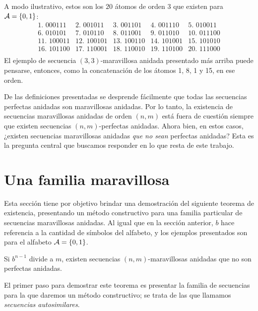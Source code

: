 A modo ilustrativo, estos son los $20$ átomos de orden $3$ que existen para
$\mathcal{A} = \lbrace 0, 1 \rbrace$:
\[
	\begin{array}{ccccc}
		\text{1. }000111 & \text{2. }001011 & \text{3. }001101 & \text{4. }001110 & \text{5. }010011 \\
		\text{6. }010101 & \text{7. }010110 & \text{8. }011001 & \text{9. }011010 & \text{10. }011100 \\
		\text{11. }100011 & \text{12. }100101 & \text{13. }100110 & \text{14. }101001 & \text{15. }101010 \\
		\text{16. }101100 & \text{17. }110001 & \text{18. }110010 & \text{19. }110100 & \text{20. }111000 \\
	\end{array}
\]
El ejemplo de secuencia $(3,3)$-maravillosa anidada presentado más arriba puede
pensarse, entonces, como la concatenación de los átomos 1, 8, 1 y 15, en ese
orden.

De las definiciones presentadas se desprende fácilmente que todas las secuencias
perfectas anidadas son maravillosas anidadas. Por lo tanto, la existencia de
secuencias maravillosas anidadas de orden $(n,m)$ está fuera de cuestión
siempre que existen secuencias $(n,m)$-perfectas anidadas. Ahora bien, en estos
casos, ¿existen secuencias maravillosas anidadas \emph{que no sean} perfectas
anidadas? Esta es la pregunta central que buscamos responder en lo que resta
de este trabajo.

\newpage

\chapter{Una familia maravillosa}
\label{chapter:autosimilar-sequences}

Esta sección tiene por objetivo brindar una demostración del siguiente teorema
de existencia, presentando un método constructivo para una familia particular
de secuencias maravillosas anidadas. Al igual que en la sección anterior,
$b$ hace referencia a la cantidad de símbolos del alfabeto, y los ejemplos
presentados son para el alfabeto $\mathcal{A} = \lbrace 0, 1 \rbrace$.

\begin{theorem}
	\label{theorem:existence-autosimilar}
	Si $b^{n-1}$ divide a $m$, existen secuencias $(n,m)$-maravillosas anidadas
	que no son perfectas anidadas.
\end{theorem}

El primer paso para demostrar este teorema es presentar la familia de secuencias
para la que daremos un método constructivo; se trata de las que llamamos
\emph{secuencias autosimilares}.


